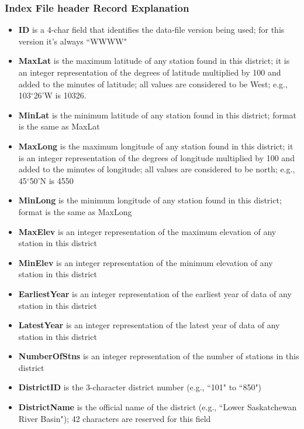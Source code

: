 \documentclass[12pt]{article}
\begin{document}
\subsubsection{Index File header Record Explanation}
\begin{itemize}
\item \textbf{ID} is a 4-char field that identifies the data-file version being used; for this version it's always ``WWWW"
\item \textbf{MaxLat} is the maximum latitude of any station found in this district; it is an integer representation of the degrees of latitude multiplied by 100 and added to the minutes of latitude; all values are considered to be West; e.g., 103$^\circ$26'W is 10326.
\item \textbf{MinLat} is the minimum latitude of any station found in this district; format is the same as MaxLat
\item \textbf{MaxLong} is the maximum longitude of any station found in this district; it is an integer representation of the degrees of longitude multiplied by 100 and added to the minutes of longitude; all values are considered to be north; e.g., 45$^\circ$50'N is 4550
\item \textbf{MinLong} is the minimum longitude of any station found in this district; format is the same as MaxLong
\item \textbf{MaxElev} is an integer representation of the maximum elevation of any station in this district
\item \textbf{MinElev} is an integer representation of the minimum elevation of any station in this district
\item \textbf{EarliestYear} is an integer representation of the earliest year of data of any station in this district
\item \textbf{LatestYear} is an integer representation of the latest year of data of any station in this district
\item \textbf{NumberOfStns} is an integer representation of the number of stations in this district
\item \textbf{DistrictID} is the 3-character district number (e.g., ``101" to ``850")
\item \textbf{DistrictName} is the official name of the district  (e.g., ``Lower Saskatchewan River Basin"); 42 characters are reserved for this field
\end{itemize}
\end{document}
